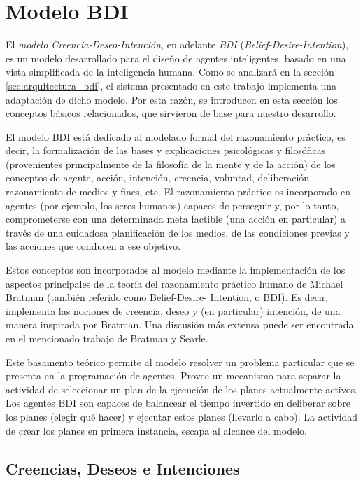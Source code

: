 \section{Modelo BDI}
\label{sec:modelo_bdi}

El \textit{modelo Creencia-Deseo-Intención}, en adelante \textit{BDI}
(\textit{Belief-Desire-Intention}), es un modelo desarrollado para el
diseño de agentes inteligentes, basado en una vista simplificada de la
inteligencia humana.
Como se analizará en la sección \ref{sec:arquitectura_bdi}, el sistema
presentado en este trabajo implementa una  adaptación de dicho modelo.
Por esta razón, se introducen en esta sección los  conceptos básicos
relacionados, que sirvieron de base para nuestro desarrollo.


El modelo BDI está dedicado al modelado formal del razonamiento
práctico, es  decir, la formalización de las bases y explicaciones
psicológicas y filosóficas  (provenientes principalmente de la
filosofía de la mente y de la acción) de los  conceptos de agente,
acción, intención, creencia, voluntad, deliberación,  razonamiento de
medios y fines, etc.
El razonamiento práctico es incorporado  en agentes (por ejemplo, los
seres humanos) capaces de perseguir y, por lo tanto,  comprometerse
con una determinada meta factible (una acción en particular)  a través
de una cuidadosa planificación de los medios, de las condiciones
previas  y las acciones que conducen a ese objetivo.


Estos conceptos son incorporados al modelo mediante la implementación
de los  aspectos principales de la teoría del razonamiento práctico
humano de Michael Bratman (también referido como Belief-Desire-
Intention, o BDI).
Es decir, implementa  las nociones de creencia, deseo y (en
particular) intención, de una manera inspirada  por Bratman.
Una discusión más extensa puede ser encontrada en el mencionado
trabajo de Bratman\cite{brat99} y Searle\cite{searle1985}.


Este basamento teórico permite al modelo resolver un problema
particular que  se presenta en la programación de agentes.
Provee un mecanismo para separar la  actividad de seleccionar un plan
de la ejecución de los planes actualmente activos.
Los agentes BDI son capaces de balancear el tiempo invertido en
deliberar sobre los planes (elegir qué hacer) y ejecutar estos planes
(llevarlo a cabo).
La actividad  de crear los planes en primera instancia, escapa al
alcance del modelo.


\subsection{Creencias, Deseos e Intenciones}
\label{sec:creencia_deseos_intenciones}



